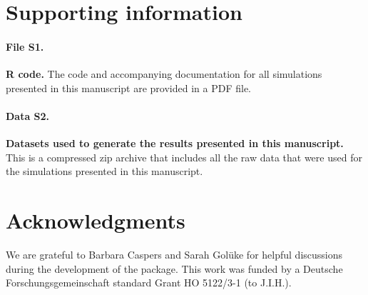 \documentclass[10pt,letterpaper]{article}
\begin{document}
\section*{Supporting information}

\paragraph*{File S1.}
\label{File S1}
{\bf R code.} The code and accompanying documentation for all simulations presented in this manuscript are provided in a PDF file.

\paragraph*{Data S2.}
\label{Data S2}
{\bf Datasets used to generate the results presented in this manuscript.} This is a compressed zip archive that includes all the raw data that were used for the simulations presented in this manuscript. 

\section*{Acknowledgments}
We are grateful to Barbara Caspers and Sarah Golüke for helpful discussions during the development of the package. This work was funded by a Deutsche Forschungsgemeinschaft standard Grant HO 5122/3-1 (to J.I.H.).

\nolinenumbers
\end{document}
